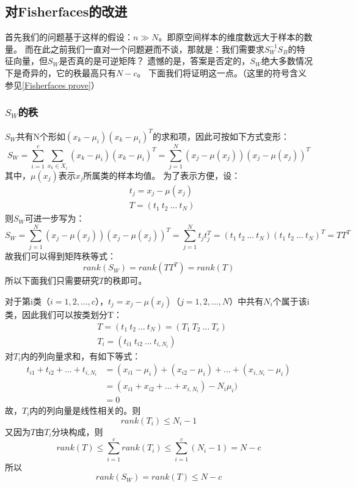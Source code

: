 \documentclass{ctexart}
\begin{document}
\subsection{对Fisherfaces的改进}
\noindent
首先我们的问题基于这样的假设：$n \gg N$。即原空间样本的维度数远大于样本的数量。
而在此之前我们一直对一个问题避而不谈，那就是：我们需要求$S_W^{-1}S_B$的特征向量，但$S_W$是否真的是可逆矩阵？
遗憾的是，答案是否定的，$S_W$绝大多数情况下是奇异的，它的秩最高只有$N-c$。
下面我们将证明这一点。（这里的符号含义参见\ref{Fisherfaces prove}）

\subsubsection{$S_W$的秩}
$S_W$共有N个形如$(x_k-\mu_i)(x_k-\mu_i)^T$的求和项，因此可按如下方式变形：
$$
    S_{W}=\sum_{i=1}^{c} \sum_{x_{k} \in X_{i}}\left(x_{k}-\mu_{i}\right)\left(x_{k}-\mu_{i}\right)^{T}
    =\sum_{j=1}^{N} (x_j-\mu(x_j))(x_j-\mu(x_j))^T
$$
其中，$\mu(x_j)$表示$x_j$所属类的样本均值。
为了表示方便，设：
\begin{equation}\nonumber
    \begin{split}
        &t_j = x_j-\mu(x_j)\\
        &T = (t_1\ t_2\ ...\ t_N)
    \end{split}
\end{equation}
则$S_W$可进一步写为：
$$
    S_{W}=\sum_{j=1}^{N} (x_j-\mu(x_j))(x_j-\mu(x_j))^T=\sum_{j=1}^{N}t_j t_j^T
    = (t_1\ t_2\ ...\ t_N)(t_1\ t_2\ ...\ t_N)^T=TT^T
$$
故我们可以得到矩阵秩等式：
$$
    rank(S_W)=rank(TT^T)=rank(T)
$$
所以下面我们只需要研究$T$的秩即可。

对于第i类（$i=1,2,...,c$），$t_j=x_j-\mu(x_j)$（$j=1,2,...,N$）中共有$N_i$个属于该i类，因此我们可以按类划分T：
\begin{equation}\nonumber
    \begin{split}
        &T = (t_1\ t_2\ ...\ t_N) = (T_1\ T_2\ ...\ T_c)\\
        &T_i = (t_{i1}\ t_{i2}\ ...\ t_{i,N_i})
    \end{split}
\end{equation}
对$T_i$内的列向量求和，有如下等式：
\begin{equation}\nonumber
    \begin{split}
        t_{i1}+ t_{i2}+ ...+ t_{i,N_i}&=(x_{i1}-\mu_i)+(x_{i2}-\mu_i)+...+(x_{i,N_i}-\mu_i)\\
        &=(x_{i1} + x_{i2} +...+x_{i,N_i})-N_i\mu_i)\\
        &=0
    \end{split}
\end{equation}
故，$T_i$内的列向量是线性相关的。则
$$rank(T_i)\leq N_i-1$$
又因为$T$由$T_i$分块构成，则
$$
    rank(T) \leq \sum_{i=1}^c rank(T_i) \leq \sum_{i=1}^c(N_i-1)=N-c
$$
所以
$$
    rank(S_W)=rank(T)\leq N-c
$$
\end{document}
